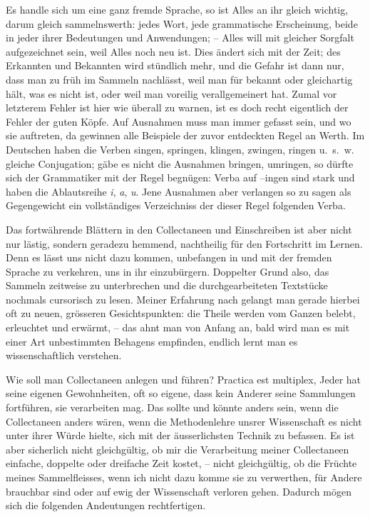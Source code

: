 Es handle sich um eine ganz fremde Sprache, so ist Alles an ihr gleich wichtig, darum gleich sammelnswerth: jedes Wort, jede grammatische Erscheinung, beide in jeder ihrer Bedeutungen und Anwendungen; – Alles will mit gleicher Sorgfalt aufgezeichnet sein, weil Alles noch neu ist. Dies ändert sich mit der Zeit; des Erkannten und Bekannten wird stündlich mehr, und die Gefahr ist dann nur, dass man zu früh im Sammeln nachlässt, weil man für bekannt oder gleichartig hält, was es nicht ist, oder weil man voreilig verallgemeinert hat. Zumal vor letzterem Fehler ist hier wie überall zu warnen, ist es doch recht eigentlich der Fehler der guten Köpfe. Auf Ausnahmen muss man immer gefasst sein, und wo sie auftreten, da gewinnen alle Beispiele der zuvor entdeckten Regel an Werth. Im Deutschen haben die Verben singen, springen, klingen, zwingen, ringen u.~s.~w. gleiche Conjugation; gäbe es nicht die Ausnahmen bringen, umringen, so dürfte sich der Grammatiker mit der Regel begnügen: Verba auf –ingen sind stark und haben die Ablautsreihe \textit{i}, \textit{a}, \textit{u}. Jene Ausnahmen aber verlangen so zu sagen als \label{fp.79} Gegengewicht ein vollständiges Verzeichniss der dieser Regel folgenden Verba.

Das fortwährende Blättern in den Collectaneen und Einschreiben ist aber nicht nur lästig, sondern geradezu hemmend, nachtheilig für den Fortschritt im \label{sp.78} Lernen. Denn es lässt uns nicht dazu kommen, unbefangen in und mit der fremden Sprache zu verkehren, uns in ihr einzubürgern. Doppelter Grund also, das Sammeln zeitweise zu unterbrechen und die durchgearbeiteten Textstücke nochmals cursorisch zu lesen. Meiner Erfahrung nach gelangt man gerade hierbei oft zu neuen, grösseren Gesichtspunkten: die Theile werden vom Ganzen belebt, erleuchtet und erwärmt, – das ahnt man von Anfang an, bald wird man es mit einer Art unbestimmten Behagens empfinden, endlich lernt man es wissenschaftlich verstehen.

Wie soll man Collectaneen anlegen und führen? Practica est multiplex, Jeder hat seine eigenen Gewohnheiten, oft so eigene, dass kein Anderer seine Sammlungen fortführen, sie verarbeiten mag. Das sollte und könnte anders sein, wenn die Collectaneen anders wären, wenn die Methodenlehre unsrer Wissenschaft es nicht unter ihrer Würde hielte, sich mit der äusserlichsten Technik zu befassen. Es ist aber sicherlich nicht gleichgültig, ob mir die Verarbeitung meiner Collectaneen einfache, doppelte oder dreifache Zeit kostet, – nicht gleichgültig, ob die Früchte meines Sammelfleisses, wenn ich nicht dazu komme sie zu verwerthen, für Andere brauchbar sind oder auf ewig der Wissenschaft verloren gehen. Dadurch mögen sich die folgenden Andeutungen rechtfertigen.

